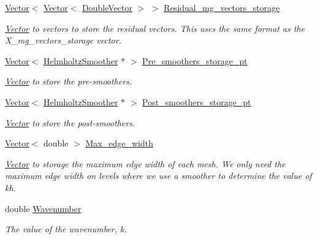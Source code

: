 \begin{DoxyCompactItemize}
\hyperlink{classoomph_1_1Vector}{Vector}$<$ \hyperlink{classoomph_1_1Vector}{Vector}$<$ \hyperlink{classoomph_1_1DoubleVector}{Double\+Vector} $>$ $>$ \hyperlink{classoomph_1_1HelmholtzMGPreconditioner_a9fb9b1da7264ccfa054a6d57120e5568}{Residual\+\_\+mg\+\_\+vectors\+\_\+storage}
\begin{DoxyCompactList}\small\item\em \hyperlink{classoomph_1_1Vector}{Vector} to vectors to store the residual vectors. This uses the same format as the X\+\_\+mg\+\_\+vectors\+\_\+storage vector. \end{DoxyCompactList}\item 
\hyperlink{classoomph_1_1Vector}{Vector}$<$ \hyperlink{classoomph_1_1HelmholtzSmoother}{Helmholtz\+Smoother} $\ast$ $>$ \hyperlink{classoomph_1_1HelmholtzMGPreconditioner_ab00508738be7bfdf669d54cef639838f}{Pre\+\_\+smoothers\+\_\+storage\+\_\+pt}
\begin{DoxyCompactList}\small\item\em \hyperlink{classoomph_1_1Vector}{Vector} to store the pre-\/smoothers. \end{DoxyCompactList}\item 
\hyperlink{classoomph_1_1Vector}{Vector}$<$ \hyperlink{classoomph_1_1HelmholtzSmoother}{Helmholtz\+Smoother} $\ast$ $>$ \hyperlink{classoomph_1_1HelmholtzMGPreconditioner_abb0d32382cd2a06081359b3fda7cc15d}{Post\+\_\+smoothers\+\_\+storage\+\_\+pt}
\begin{DoxyCompactList}\small\item\em \hyperlink{classoomph_1_1Vector}{Vector} to store the post-\/smoothers. \end{DoxyCompactList}\item 
\hyperlink{classoomph_1_1Vector}{Vector}$<$ double $>$ \hyperlink{classoomph_1_1HelmholtzMGPreconditioner_a2ca185f62bdfff032503899ea2fbc22c}{Max\+\_\+edge\+\_\+width}
\begin{DoxyCompactList}\small\item\em \hyperlink{classoomph_1_1Vector}{Vector} to storage the maximum edge width of each mesh. We only need the maximum edge width on levels where we use a smoother to determine the value of kh. \end{DoxyCompactList}\item 
double \hyperlink{classoomph_1_1HelmholtzMGPreconditioner_ab20414b53c2e1a576da68c50a3b89e5e}{Wavenumber}
\begin{DoxyCompactList}\small\item\em The value of the wavenumber, k. \end{DoxyCompactList}\item 

\end{DoxyCompactItemize}

